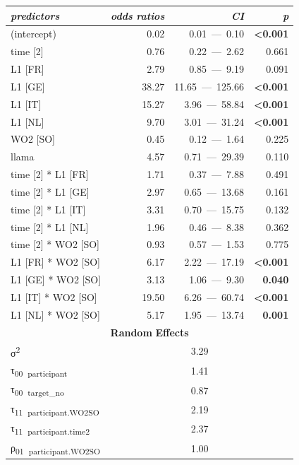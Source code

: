 \begin{table}
    \begin{tabularx}{\textwidth}{Xrrr}
    \lsptoprule
    \textit{predictors} & \textit{odds} \textit{ratios} & \textit{CI} & \textit{p}\\
    \midrule
    (intercept) & 0.02 & 0.01~—~0.10 & \textbf{<0.001}\\
    time [2] & 0.76 & 0.22~—~2.62 & 0.661\\
    L1 [FR] & 2.79 & 0.85~—~9.19 & 0.091\\
    L1 [GE] & 38.27 & 11.65~—~125.66 & \textbf{<0.001}\\
    L1 [IT] & 15.27 & 3.96~—~58.84 & \textbf{<0.001}\\
    L1 [NL] & 9.70 & 3.01~—~31.24 & \textbf{<0.001}\\
    WO2 [SO] & 0.45 & 0.12~—~1.64 & 0.225\\
    llama & 4.57 & 0.71~—~29.39 & 0.110\\
    time [2] * L1 [FR] & 1.71 & 0.37~—~7.88 & 0.491\\
    time [2] * L1 [GE] & 2.97 & 0.65~—~13.68 & 0.161\\
    time [2] * L1 [IT] & 3.31 & 0.70~—~15.75 & 0.132\\
    time [2] * L1 [NL] & 1.96 & 0.46~—~8.38 & 0.362\\
    time [2] * WO2 [SO] & 0.93 & 0.57~—~1.53 & 0.775\\
    L1 [FR] * WO2 [SO] & 6.17 & 2.22~—~17.19 & \textbf{<0.001}\\
    L1 [GE] * WO2 [SO] & 3.13 & 1.06~—~9.30 & \textbf{0.040}\\
    L1 [IT] * WO2 [SO] & 19.50 & 6.26~—~60.74 & \textbf{<0.001}\\
    L1 [NL] * WO2 [SO] & 5.17 & 1.95~—~13.74 & \textbf{0.001}\\
    \multicolumn{4}{c}{\textbf{Random} \textbf{Effects}}\\
    σ\textsuperscript{2} & \multicolumn{3}{c}{3.29}\\
    τ\textsubscript{00}~\textsubscript{participant} & \multicolumn{3}{c}{1.41}\\
    τ\textsubscript{00}~\textsubscript{target\_no} & \multicolumn{3}{c}{0.87}\\
    τ\textsubscript{11}~\textsubscript{participant.WO2SO} & \multicolumn{3}{c}{2.19}\\
    τ\textsubscript{11}~\textsubscript{participant.time2} & \multicolumn{3}{c}{2.37}\\
    ρ\textsubscript{01}~\textsubscript{participant.WO2SO} & \multicolumn{3}{c}{1.00}\\

\end{tabularx}
\end{table}
